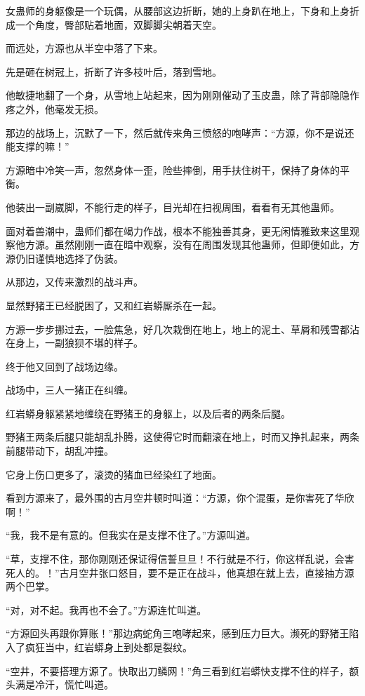 
\begin{this_body}

女蛊师的身躯像是一个玩偶，从腰部这边折断，她的上身趴在地上，下身和上身折成一个角度，臀部贴着地面，双脚脚尖朝着天空。

而远处，方源也从半空中落了下来。

先是砸在树冠上，折断了许多枝叶后，落到雪地。

他敏捷地翻了一个身，从雪地上站起来，因为刚刚催动了玉皮蛊，除了背部隐隐作疼之外，他毫发无损。

那边的战场上，沉默了一下，然后就传来角三愤怒的咆哮声：“方源，你不是说还能支撑的嘛！”

方源暗中冷笑一声，忽然身体一歪，险些摔倒，用手扶住树干，保持了身体的平衡。

他装出一副崴脚，不能行走的样子，目光却在扫视周围，看看有无其他蛊师。

面对着兽潮中，蛊师们都在竭力作战，根本不能独善其身，更无闲情雅致来这里观察他方源。虽然刚刚一直在暗中观察，没有在周围发现其他蛊师，但即便如此，方源仍旧谨慎地选择了伪装。

从那边，又传来激烈的战斗声。

显然野猪王已经脱困了，又和红岩蟒厮杀在一起。

方源一步步挪过去，一脸焦急，好几次栽倒在地上，地上的泥土、草屑和残雪都沾在身上，一副狼狈不堪的样子。

终于他又回到了战场边缘。

战场中，三人一猪正在纠缠。

红岩蟒身躯紧紧地缠绕在野猪王的身躯上，以及后者的两条后腿。

野猪王两条后腿只能胡乱扑腾，这使得它时而翻滚在地上，时而又挣扎起来，两条前腿带动下，胡乱冲撞。

它身上伤口更多了，滚烫的猪血已经染红了地面。

看到方源来了，最外围的古月空井顿时叫道：“方源，你个混蛋，是你害死了华欣啊！”

“我，我不是有意的。但我实在是支撑不住了。”方源叫道。

“草，支撑不住，那你刚刚还保证得信誓旦旦！不行就是不行，你这样乱说，会害死人的。！”古月空井张口怒目，要不是正在战斗，他真想在就上去，直接抽方源两个巴掌。

“对，对不起。我再也不会了。”方源连忙叫道。

“方源回头再跟你算账！”那边病蛇角三咆哮起来，感到压力巨大。濒死的野猪王陷入了疯狂当中，红岩蟒身上到处都是裂纹。

“空井，不要搭理方源了。快取出刀鳞网！”角三看到红岩蟒快支撑不住的样子，额头满是冷汗，慌忙叫道。


\end{this_body}

